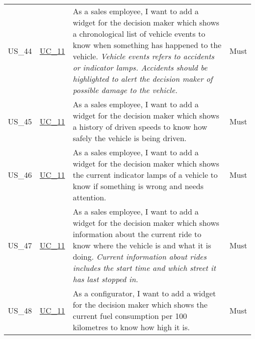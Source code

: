 \begin{footnotesize}
\begin{longtable}[L L L]{ p{} p{} p{} p{} }
      \hypertarget{Ref:US44}{US\_44} & \hyperlink{Ref:UC11}{UC\_11} & As a sales employee, I want to add a \gls{widget} for the decision maker which shows a chronological list of vehicle events to know when something has happened to the vehicle. 
      \newline
      \emph{Vehicle events refers to accidents or indicator lamps. Accidents should be highlighted to alert the decision maker of possible damage to the vehicle.} & Must
      \\
      \hypertarget{Ref:US45}{US\_45} & \hyperlink{Ref:UC11}{UC\_11} & As a sales employee, I want to add a \gls{widget} for the decision maker which shows a history of driven speeds to know how safely the vehicle is being driven. & Must \\
      \hypertarget{Ref:US46}{US\_46} & \hyperlink{Ref:UC11}{UC\_11} & As a sales employee, I want to add a \gls{widget} for the decision maker which shows the current indicator lamps of a vehicle to know if something is wrong and needs attention. & Must \\
      \hypertarget{Ref:US47}{US\_47} & \hyperlink{Ref:UC11}{UC\_11} & As a sales employee, I want to add a \gls{widget} for the decision maker which shows information about the current ride to know where the vehicle is and what it is doing.
      \newline
      \emph{Current information about rides includes the start time and which street it has last stopped in.} & Must \\
      \hypertarget{Ref:US48}{US\_48} & \hyperlink{Ref:UC11}{UC\_11} & As a configurator, I want to add a \gls{widget} for the decision maker which shows the current fuel consumption per 100 kilometres to know how high it is. & Must \\

      \bottomrule
    \end{longtable}
  \end{footnotesize}
  \rmfamily

